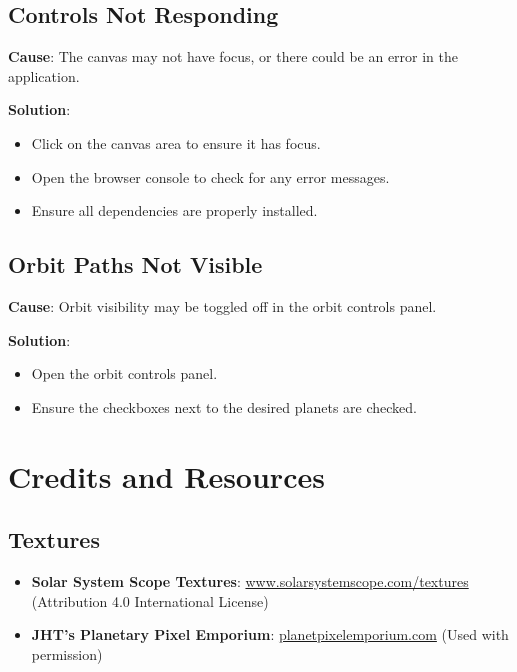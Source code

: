 \documentclass[12pt, a4paper]{article}
\begin{document}
\subsection{Controls Not Responding}

\textbf{Cause}: The canvas may not have focus, or there could be an error in the application.

\textbf{Solution}:

\begin{itemize}
    \item Click on the canvas area to ensure it has focus.
    \item Open the browser console to check for any error messages.
    \item Ensure all dependencies are properly installed.
\end{itemize}

\subsection{Orbit Paths Not Visible}

\textbf{Cause}: Orbit visibility may be toggled off in the orbit controls panel.

\textbf{Solution}:

\begin{itemize}
    \item Open the orbit controls panel.
    \item Ensure the checkboxes next to the desired planets are checked.
\end{itemize}

\section{Credits and Resources}

\subsection{Textures}

\begin{itemize}
    \item \textbf{Solar System Scope Textures}: \href{https://www.solarsystemscope.com/textures/}{www.solarsystemscope.com/textures} (Attribution 4.0 International License)
    \item \textbf{JHT's Planetary Pixel Emporium}: \href{https://planetpixelemporium.com/}{planetpixelemporium.com} (Used with permission)
\end{itemize}
\end{document}
